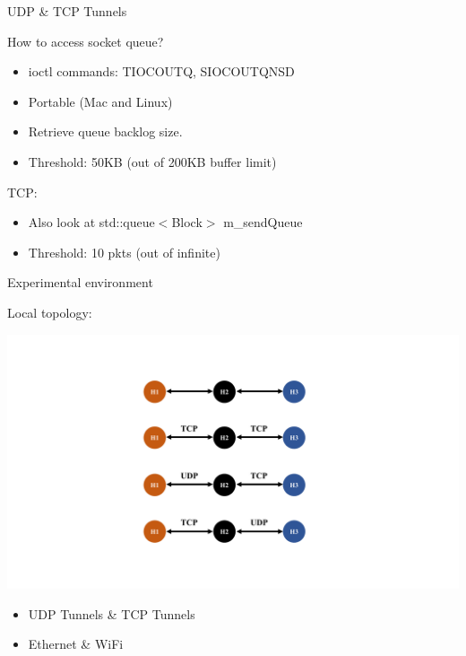 \begin{frame}{UDP \& TCP Tunnels}

How to access socket queue? 
\begin{itemize}
\item ioctl commands: TIOCOUTQ, SIOCOUTQNSD
\item Portable (Mac and Linux)
\item Retrieve queue backlog size.
\item Threshold: 50KB (out of 200KB buffer limit)
\end{itemize}

\pause
TCP: 
\begin{itemize}
\item Also look at std::queue$<$Block$>$ m\_sendQueue
\item Threshold: 10 pkts (out of infinite)
\end{itemize}

\end{frame}



\begin{frame}{Experimental environment}

Local topology:

\includegraphics[width=\linewidth]{../figs/Figure_3.pdf}

\begin{itemize}
\item UDP Tunnels \& TCP Tunnels
\item Ethernet \& WiFi
\end{itemize}

\end{frame}


